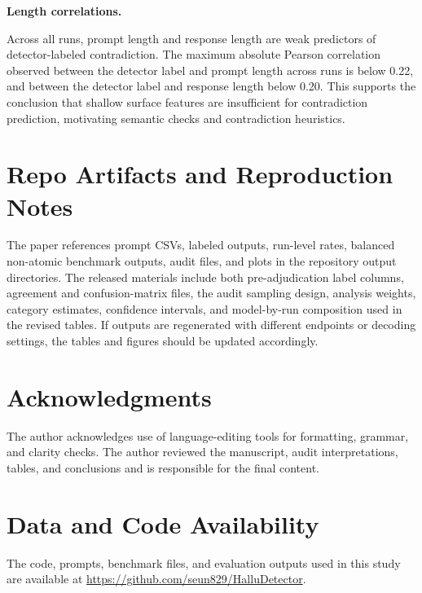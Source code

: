 \documentclass[11pt]{article}
\begin{document}
\textbf{Length correlations.}

Across all runs, prompt length and response length are weak predictors of detector-labeled contradiction. The maximum absolute Pearson correlation observed between the detector label and prompt length across runs is below 0.22, and between the detector label and response length below 0.20. This supports the conclusion that shallow surface features are insufficient for contradiction prediction, motivating semantic checks and contradiction heuristics.




\section*{Repo Artifacts and Reproduction Notes}
The paper references prompt CSVs, labeled outputs, run-level rates, balanced non-atomic benchmark outputs, audit files, and plots in the repository output directories. The released materials include both pre-adjudication label columns, agreement and confusion-matrix files, the audit sampling design, analysis weights, category estimates, confidence intervals, and model-by-run composition used in the revised tables. If outputs are regenerated with different endpoints or decoding settings, the tables and figures should be updated accordingly.

\section*{Acknowledgments}
The author acknowledges use of language-editing tools for formatting, grammar, and clarity checks. The author reviewed the manuscript, audit interpretations, tables, and conclusions and is responsible for the final content.

\section*{Data and Code Availability}
The code, prompts, benchmark files, and evaluation outputs used in this study are available at \url{https://github.com/seun829/HalluDetector}.
\end{document}
